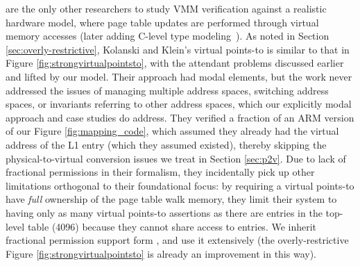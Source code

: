 \citet{kolanski08vstte} are the only other researchers to study VMM verification against a realistic hardware
model, where page table updates are performed through virtual memory accesses (later adding C-level type modeling~\cite{kolanski09tphols}).
As noted in Section \ref{sec:overly-restrictive}, Kolanski and Klein's virtual points-to is similar to that in Figure \ref{fig:strongvirtualpointsto},
with the attendant problems discussed earlier and lifted by our model. Their approach had modal elements,
but the work never addressed the issues of managing multiple address spaces, switching address spaces, or
invariants referring to other address spaces, which our explicitly modal approach and case studies do address.
They verified a fraction of an ARM version of our Figure \ref{fig:mapping_code}, which assumed they already had the virtual address
of the L1 entry (which they assumed existed), thereby skipping the physical-to-virtual conversion issues we treat in Section \ref{sec:p2v}.
Due to lack of fractional permissions in their formalism, they incidentally pick up other limitations orthogonal to their
foundational focus: by requiring
a virtual points-to have \emph{full} ownership of the page table walk memory, they limit their system to having only as many
virtual points-to assertions as there are entries in the top-level table (4096) because they cannot share access to entries.
We inherit fractional permission support form \iris, and use it extensively (the overly-restrictive
Figure \ref{fig:strongvirtualpointsto} is already an improvement in this way).
 

